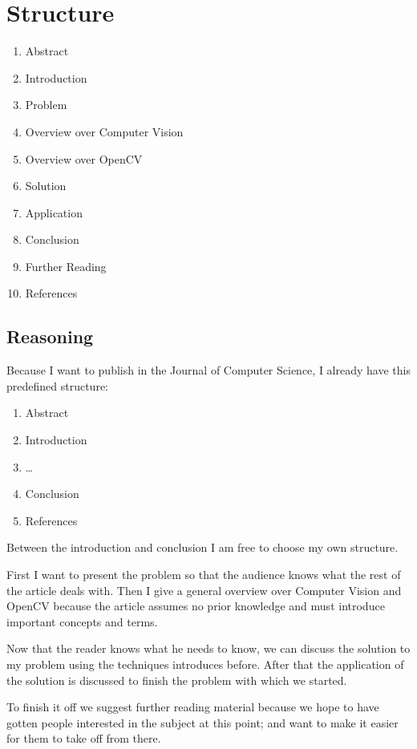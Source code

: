 \documentclass[12pt, a4paper]{article}
\begin{document}
\section*{Structure}
\begin{enumerate}
	\item Abstract
	\item Introduction
	\item Problem
	\item Overview over Computer Vision
	\item Overview over OpenCV
	\item Solution
	\item Application
	\item Conclusion
	\item Further Reading
	\item References
\end{enumerate}

\subsection*{Reasoning}
Because I want to publish in the Journal of Computer Science, I already have this predefined structure:

\begin{enumerate}
	\item Abstract
	\item Introduction
	\item \dots
	\item Conclusion
	\item References
\end{enumerate}

Between the introduction and conclusion I am free to choose my own structure.

First I want to present the problem so that the audience knows what the rest of the article deals with. Then I give a general overview over Computer Vision and OpenCV because the article assumes no prior knowledge and must introduce important concepts and terms.

Now that the reader knows what he needs to know, we can discuss the solution to my problem using the techniques introduces before. After that the application of the solution is discussed to finish the problem with which we started.

To finish it off we suggest further reading material because we hope to have gotten people interested in the subject at this point; and want to make it easier for them to take off from there.
\end{document}
